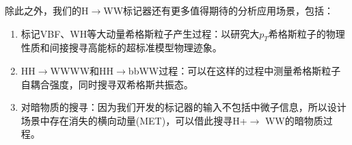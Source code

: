 除此之外，我们的H$\to$WW标记器还有更多值得期待的分析应用场景，包括：
\begin{enumerate}[$\bullet$]
    \item 标记VBF、WH等大动量希格斯粒子产生过程：以研究大$p_T$希格斯粒子的物理性质和间接搜寻高能标的超标准模型物理迹象。
    \item HH$\to$WWWW和HH$\to$bbWW过程：可以在这样的过程中测量希格斯粒子自耦合强度，同时搜寻双希格斯共振态。
    \item 对暗物质的搜寻：因为我们开发的标记器的输入不包括中微子信息，所以设计场景中存在消失的横向动量(MET)，可以借此搜寻H+$\to$ WW的暗物质过程。
\end{enumerate}